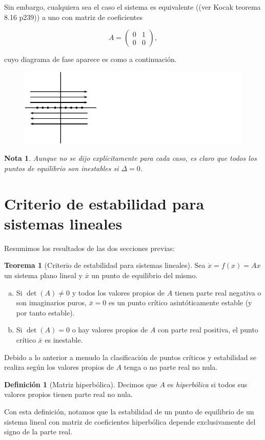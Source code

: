 \documentclass[11pt]{book}
\theoremstyle{definition}
\newtheorem{definition}{Definición}
\numberwithin{definition}{section}
\theoremstyle{theorem}
\newtheorem{theorem}{Teorema}
\numberwithin{theorem}{section}
\numberwithin{lemma}{section}
\numberwithin{corollary}{section}
\theoremstyle{plain}
\numberwithin{example}{section}
\newtheorem{remark}{Nota}
\begin{document}
Sin embargo, cualquiera sea el caso el sistema es equivalente ((ver Kocak teorema 8.16 p239)) a uno con matriz de coeficientes

$$ A = \left( \begin{array}{ll} 0 & 1 \\ 0 & 0 \end{array} \right),$$

cuyo diagrama de fase aparece es como a continuación.

\begin{figure}[!ht] \centering
    \includegraphics[scale=1.0]{figures/asingularr1.pdf}
\end{figure}

\begin{remark}Aunque no se dijo explícitamente para cada caso, es claro que todos los puntos de equilibrio son \emph{inestables} si $\Delta = 0$.
\end{remark}

\section{Criterio de estabilidad para sistemas lineales}
Resumimos los resultados de las dos secciones previas:

\begin{theorem}[Criterio de estabilidad para sistemas lineales] \label{teo:criterioestabilidadlineales}
Sea $\dot{x} = f(x) = Ax$ un sistema plano lineal y $\bar{x}$ un punto de equilibrio del mismo.

\begin{enumerate}[(a)]
	\item Si $\det(A) \neq 0$ y todos los valores propios de $A$ tienen parte real negativa o son imaginarios puros, $\bar{x} = 0$ es un punto crítico asintóticamente estable (y por tanto estable).
	\item Si $\det(A) = 0$ o hay valores propios de $A$ con parte real positiva, el punto crítico $\bar{x}$ es inestable.
\end{enumerate}

Debido a lo anterior a menudo la clasificación de puntos críticos y estabilidad se realiza según los valores propios de $A$ tenga o no parte real no nula.

\begin{definition}[Matriz hiperbólica] Decimos que $A$ es \emph{hiperbólica} si todos sus valores propios tienen parte real no nula.
\end{definition}

Con esta definición, notamos que la estabilidad de un punto de equilibrio de un sistema lineal con matriz de coeficientes hiperbólica depende exclusivamente del signo de la parte real.

\end{theorem}
\end{document}
